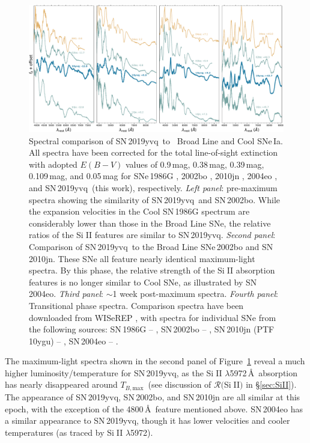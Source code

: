 \documentclass[twocolumn]{aastex63}
\def\ion#1#2{#1$\;${\footnotesize\rm{#2}}\relax}
\newcommand{\tbmax}{$T_{B,\mathrm{max}}$}
\newcommand{\sn}{SN\,2019yvq}
\begin{document}
\begin{figure}
    \centering
    \includegraphics[width=7.25in]{./figures/spec_comp_extinction.pdf}
    \caption{Spectral comparison of \sn\ to \citeauthor{Branch06}~Broad Line
    and Cool SNe\,Ia. All spectra have been corrected for the total
    line-of-sight extinction with adopted $E(B-V)$ values of 0.9\,mag,
    0.38\,mag, 0.39\,mag, 0.109\,mag, and 0.05\,mag for SNe\,1986G
    \citep{Phillips87}, 2002bo \citep{Stehle05}, 2010jn \citep{Hachinger13},
    2004eo \citep{Pastorello07}, and \sn\ (this work), respectively.
    \textit{Left panel}: pre-maximum spectra showing the similarity of \sn\
    and SN\,2002bo. While the expansion velocities in the Cool SN\,1986G
    spectrum are considerably lower than those in the Broad Line SNe, the
    relative ratios of the \ion{Si}{II} features are similar to \sn.
    \textit{Second panel}: Comparison of \sn\ to the Broad Line SNe\,2002bo
    and SN\,2010jn. These SNe all feature nearly identical maximum-light
    spectra. By this phase, the relative strength of the \ion{Si}{II}
    absorption features is no longer similar to \citet{Branch06} Cool SNe, as
    illustrated by SN\,2004eo. \textit{Third panel}: $\sim$1 week post-maximum
    spectra. \textit{Fourth panel}: Transitional phase spectra. Comparison
    spectra have been downloaded from WISeREP \citep{Yaron12}, with spectra
    for individual SNe from the following sources: SN\,1986G --
    \citet{Cristiani92}, SN\,2002bo -- \citet{Benetti04,Silverman11},
    SN\,2010jn (PTF\,10ygu) -- \citet{Hachinger13,Maguire14}, SN\,2004eo --
    \citet{Pastorello07}.}
    \label{fig:spec_comp}
\end{figure}

The maximum-light spectra shown in the second panel of
Figure~\ref{fig:spec_comp} reveal a much higher luminosity/temperature for
\sn, as the \ion{Si}{II} $\lambda$5972\,\AA\ absorption has nearly disappeared
around \tbmax\ (see discussion of $\mathcal{R}($\ion{Si}{II}$)$ in
\S\ref{sec:SiII}). The appearance of \sn, SN\,2002bo, and SN\,2010jn are all
similar at this epoch, with the exception of the 4800\,\AA\ feature mentioned
above. SN\,2004eo has a similar appearance to \sn, though it has lower
velocities and cooler temperatures (as traced by \ion{Si}{II} $\lambda$5972).
\end{document}
